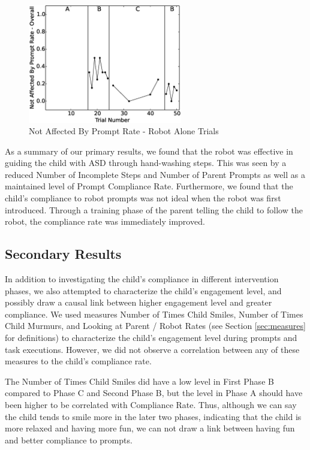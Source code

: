 \begin{figure} [h]
	\centering
	\includegraphics[width=0.6\textwidth]{./img/data_analysis/99NotAffectedByPromptRate-Overall_robotAloneOnly.eps}
	\caption{Not Affected By Prompt Rate - Robot Alone Trials}
	\label{fig:99NotAffectedByPromptRate-Overall_robotAloneOnly}
\end{figure}

As a summary of our primary results, we found that the robot was effective in guiding the child with ASD through hand-washing steps.  This was seen by a reduced Number of Incomplete Steps and Number of Parent Prompts as well as a maintained level of Prompt Compliance Rate.  Furthermore, we found that the child's compliance to robot prompts was not ideal when the robot was first introduced.  Through a training phase of the parent telling the child to follow the robot, the compliance rate was immediately improved.

\subsection{Secondary Results}
In addition to investigating the child's compliance in different intervention phases, we also attempted to characterize the child's engagement level, and possibly draw a causal link between higher engagement level and greater compliance.  We used measures Number of Times Child Smiles, Number of Times Child Murmurs, and Looking at Parent / Robot Rates (see Section \ref{sec:measures} for definitions) to characterize the child's engagement level during prompts and task executions.  However, we did not observe a correlation between any of these measures to the child's compliance rate.

The Number of Times Child Smiles did have a low level in First Phase B compared to Phase C and Second Phase B, but the level in Phase A should have been higher to be correlated with Compliance Rate.  Thus, although we can say the child tends to smile more in the later two phases, indicating that the child is more relaxed and having more fun, we can not draw a link between having fun and better compliance to prompts.

